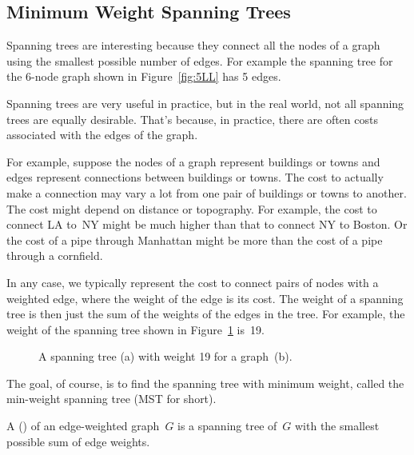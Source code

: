 \subsection{Minimum Weight Spanning Trees}\label{MST_subsec}

Spanning trees are interesting because they connect all the nodes of a
graph using the smallest possible number of edges.  For example the
spanning tree for the 6-node graph shown in Figure~\ref{fig:5LL} has 5
edges.

Spanning trees are very useful in practice, but in the real world, not
all spanning trees are equally desirable.  That's because, in
practice, there are often costs associated with the edges of the graph.

For example, suppose the nodes of a graph represent buildings or towns
and edges represent connections between buildings or towns.  The cost
to actually make a connection may vary a lot from one pair of
buildings or towns to another.  The cost might depend on distance or
topography.  For example, the cost to connect LA to~NY might be much
higher than that to connect NY to Boston.  Or the cost of a pipe
through Manhattan might be more than the cost of a pipe through a
cornfield.

In any case, we typically represent the cost to connect pairs of nodes
with a weighted edge, where the weight of the edge is its cost.  The
weight of a spanning tree is then just the sum of the weights of the
edges in the tree.  For example, the weight of the spanning tree shown
in Figure~\ref{fig:5KA} is~19.

\begin{figure}

%
\qquad
%

\caption{A spanning tree (a) with weight 19 for a graph~(b).}

\label{fig:5KA}

\end{figure}

The goal, of course, is to find the spanning tree with minimum weight,
called the min-weight spanning tree (MST for short).

\begin{definition}
A  (\textup{}\textup) of
an edge-weighted graph~$G$ is a spanning tree of~$G$ with the
smallest possible sum of edge weights.
\end{definition}

